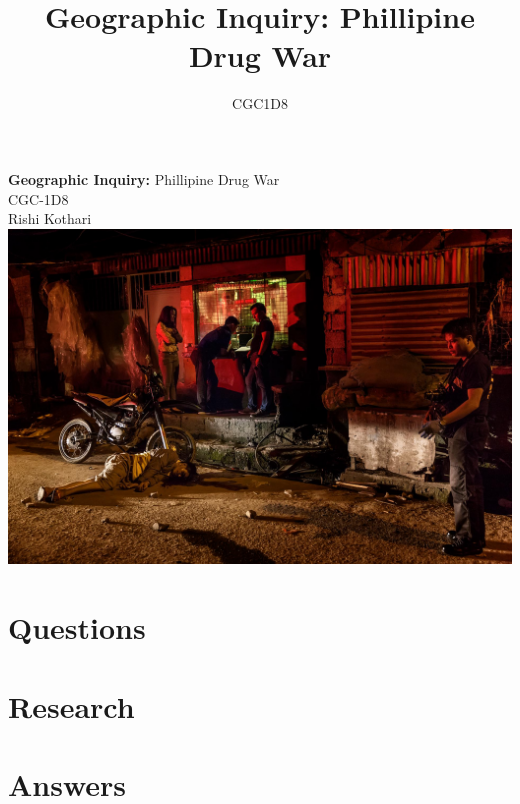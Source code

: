\documentclass[titlepic]{report}
\title{\Huge \textbf{Geographic Inquiry: } Phillipine Drug War}
\date{CGC1D8}
\begin{document}
\begin{titlepage}
    \centering
    \vfill
    {\Huge
     \textbf{Geographic Inquiry: } Phillipine Drug War\\
     \vskip0.5cm
     \Large CGC-1D8\\
        \vskip0.5cm
        Rishi Kothari\\
    }    
    \vskip1cm
    \includegraphics[width=\columnwidth]{graphics/philliphine-drug-war-1.jpg} %
    \vfill
    \vfill
\end{titlepage}

\newpage

\tableofcontents
\newpage


\chapter{Questions}


\chapter{Research}

\chapter{Answers}
\end{document}
